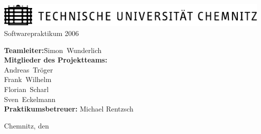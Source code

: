 
\begin{titlepage}
	\begin{center}\sffamily
		\vspace{15mm}
		\includegraphics{tuclogo}
		\vfill
		{%
			\large Softwarepraktikum 2006\\[1.5ex]
		}
		\vfill \vfill

		\textbf{\Huge\dctitle}
		\vspace{1.5cm}
		
		\textbf{\Large\dcsubject}

		\textsc{\Large \dcsubtitle}
		\vfill \vfill
	\end{center}
	
	
	{%
		\begin{tabbing}
			\hspace{4.5cm}\=\textbf{Teamleiter:}\hspace{0.5cm}\=Simon~Wunderlich\\[2.0ex]
				\>\textbf{Mitglieder des Projektteams:}\\[1.5ex]
				\>            \>Andreas~Tröger \\[1.5ex]
				\>            \>Frank~Wilhelm \\[1.5ex]
				\>            \>Florian~Scharl \\[1.5ex]
				\>            \>Sven~Eckelmann \\[4.0ex]
				\> \textbf{Praktikumsbetreuer:} Michael Rentzsch
		\end{tabbing}
	}
	\vfill
	
	{%
		Chemnitz, den \dcdate
	}
\end{titlepage}
